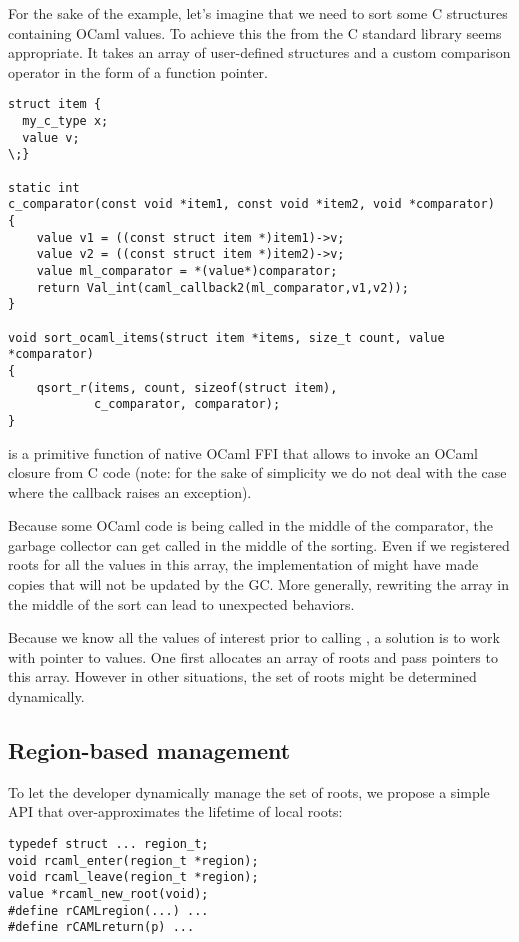 \documentclass[a4paper]{easychair}
\newcommand{\cpp}[1]{\smash{\lstinline[style=C++]{#1}}}
\begin{document}
For the sake of the example, let's imagine that we need to sort some C
structures containing OCaml values. To achieve this the
\cpp{qsort\_r} from the C standard library seems appropriate. It
takes an array of user-defined structures and a custom comparison
operator in the form of a function pointer.

\begin{lstlisting}[style=C++]
struct item {
  my_c_type x;
  value v;
\;}

static int
c_comparator(const void *item1, const void *item2, void *comparator)
{
    value v1 = ((const struct item *)item1)->v;
    value v2 = ((const struct item *)item2)->v;
    value ml_comparator = *(value*)comparator;
    return Val_int(caml_callback2(ml_comparator,v1,v2));
}

void sort_ocaml_items(struct item *items, size_t count, value *comparator)
{
    qsort_r(items, count, sizeof(struct item),
            c_comparator, comparator);
}
\end{lstlisting}

\cpp{caml\_callback2} is a primitive function of native OCaml FFI
that allows to invoke an OCaml closure from C code (note: for the sake
of simplicity we do not deal with the case where the callback raises an
exception).

Because some OCaml code is being called in the middle of the comparator,
the garbage collector can get called in the middle of the sorting. Even
if we registered roots for all the values in this array, the
implementation of \cpp{qsort\_r} might have made copies that will not
be updated by the GC. More generally, rewriting the array in the middle
of the sort can lead to unexpected behaviors.

Because we know all the values of interest prior to calling
\cpp{qsort\_r}, a solution is to work with pointer to values. One
first allocates an array of roots and pass pointers to this array.
However in other situations, the set of roots might be determined
dynamically.

\subsection{Region-based management}

To let the developer dynamically manage the set of roots, we propose a
simple API that over-approximates the lifetime of local roots:

\begin{lstlisting}[style=C++]
typedef struct ... region_t;
void rcaml_enter(region_t *region);
void rcaml_leave(region_t *region);
value *rcaml_new_root(void);
#define rCAMLregion(...) ...
#define rCAMLreturn(p) ...
\end{lstlisting}
\end{document}
